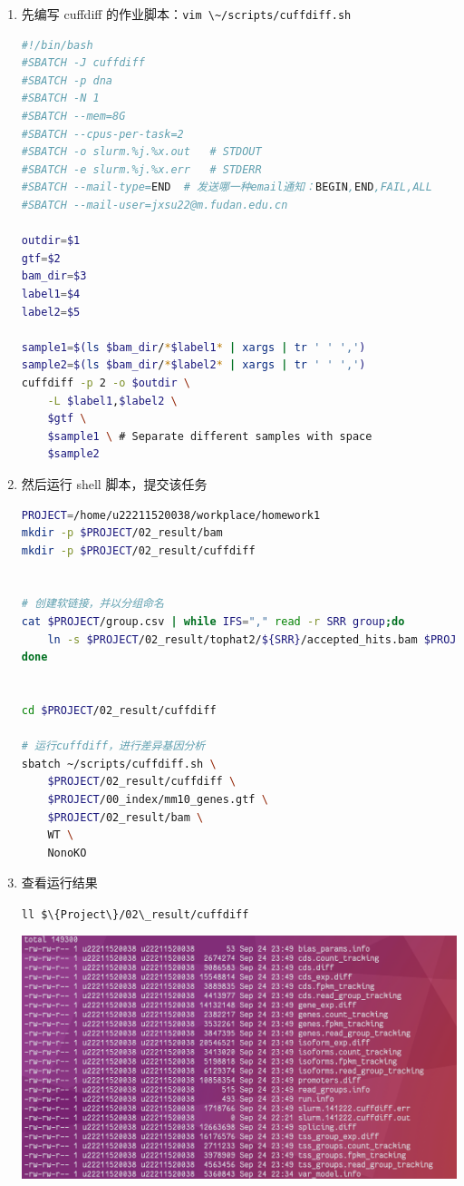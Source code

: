 \documentclass[
  a4paper,
]{article}
\newcommand{\passthrough}[1]{#1}
\begin{document}
\begin{enumerate}
\def\labelenumi{\arabic{enumi}.}
\item
  先编写 cuffdiff
  的作业脚本：\passthrough{\lstinline!vim \~/scripts/cuffdiff.sh!}

\begin{lstlisting}[language=bash]
#!/bin/bash
#SBATCH -J cuffdiff
#SBATCH -p dna
#SBATCH -N 1
#SBATCH --mem=8G
#SBATCH --cpus-per-task=2
#SBATCH -o slurm.%j.%x.out   # STDOUT
#SBATCH -e slurm.%j.%x.err   # STDERR
#SBATCH --mail-type=END  # 发送哪一种email通知：BEGIN,END,FAIL,ALL
#SBATCH --mail-user=jxsu22@m.fudan.edu.cn

outdir=$1
gtf=$2
bam_dir=$3
label1=$4
label2=$5

sample1=$(ls $bam_dir/*$label1* | xargs | tr ' ' ',')
sample2=$(ls $bam_dir/*$label2* | xargs | tr ' ' ',')
cuffdiff -p 2 -o $outdir \
    -L $label1,$label2 \
    $gtf \
    $sample1 \ # Separate different samples with space
    $sample2
\end{lstlisting}
\item
  然后运行 shell 脚本，提交该任务

\begin{lstlisting}[language=bash]
PROJECT=/home/u22211520038/workplace/homework1
mkdir -p $PROJECT/02_result/bam
mkdir -p $PROJECT/02_result/cuffdiff


# 创建软链接，并以分组命名
cat $PROJECT/group.csv | while IFS="," read -r SRR group;do
    ln -s $PROJECT/02_result/tophat2/${SRR}/accepted_hits.bam $PROJECT/02_result/bam/${group}.bam
done


cd $PROJECT/02_result/cuffdiff

# 运行cuffdiff，进行差异基因分析
sbatch ~/scripts/cuffdiff.sh \
    $PROJECT/02_result/cuffdiff \
    $PROJECT/00_index/mm10_genes.gtf \
    $PROJECT/02_result/bam \
    WT \
    NonoKO

\end{lstlisting}
\item
  查看运行结果

  \passthrough{\lstinline!ll $\{Project\}/02\_result/cuffdiff!}

  \includegraphics{assets/image-20220928231232-lzbzun2.png}\hspace{0pt}


\end{enumerate}
\end{document}
